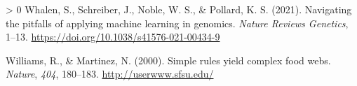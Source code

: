 \documentclass[10pt,oneside]{article}
\newlength{\cslhangindent}
\newenvironment{CSLReferences}[3] %
 {%
  \setlength{\parindent}{0pt}
  \ifodd #1 \everypar{\setlength{\hangindent}{\cslhangindent}}\ignorespaces\fi
  \ifnum #2 > 0
  \setlength{\parskip}{#2\baselineskip}
  \fi
 }%
 {}
\begin{document}
\begin{CSLReferences}{1}{0}
\leavevmode\hypertarget{ref-Whalen2021NavPit}{}%
Whalen, S., Schreiber, J., Noble, W. S., \& Pollard, K. S. (2021).
Navigating the pitfalls of applying machine learning in genomics.
\emph{Nature Reviews Genetics}, 1--13.
\url{https://doi.org/10.1038/s41576-021-00434-9}

\leavevmode\hypertarget{ref-Williams2000SimRul}{}%
Williams, R., \& Martinez, N. (2000). Simple rules yield complex food
webs. \emph{Nature}, \emph{404}, 180--183.
\href{http://userwww.sfsu.edu/\%20}{http://userwww.sfsu.edu/}

\end{CSLReferences}
\end{document}
